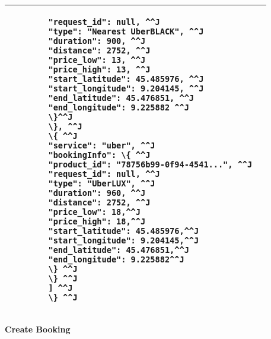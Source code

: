 \begin{tabularx}{\linewidth}{| l | l |}
{\begin{lstlisting}
		"request_id": null, ^^J
		"type": "Nearest UberBLACK", ^^J
		"duration": 900, ^^J
		"distance": 2752, ^^J
		"price_low": 13, ^^J
		"price_high": 13, ^^J
		"start_latitude": 45.485976, ^^J
		"start_longitude": 9.204145, ^^J
		"end_latitude": 45.476851, ^^J
		"end_longitude": 9.225882 ^^J
		\}^^J
		\}, ^^J
		\{ ^^J
		"service": "uber", ^^J
		"bookingInfo": \{ ^^J
		"product_id": "78756b99-0f94-4541...", ^^J
		"request_id": null, ^^J
		"type": "UberLUX", ^^J
		"duration": 960, ^^J
		"distance": 2752, ^^J
		"price_low": 18,^^J
		"price_high": 18,^^J
		"start_latitude": 45.485976,^^J
		"start_longitude": 9.204145,^^J
		"end_latitude": 45.476851,^^J
		"end_longitude": 9.225882^^J
		\} ^^J
		\} ^^J
		] ^^J
		\} ^^J
		\end{lstlisting}
	} \\
	\hline
\end{tabularx}
\newpage
\textbf{Create Booking}


